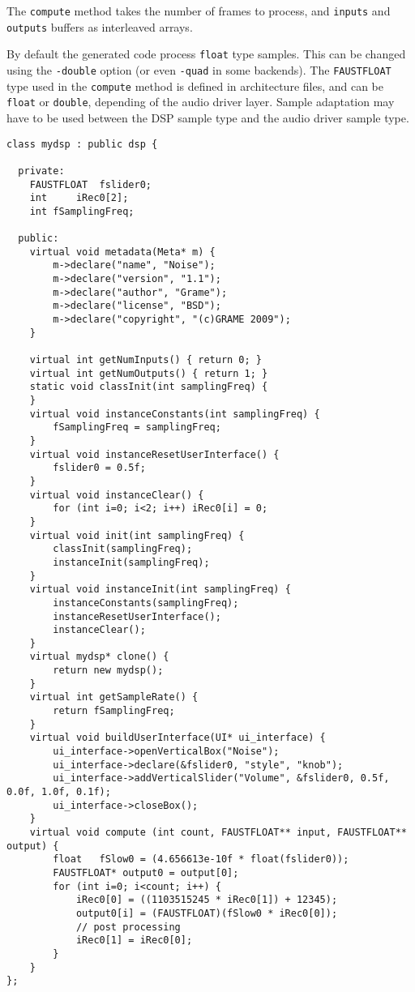 The \lstinline'compute' method takes the number of frames to process, and \lstinline'inputs' and \lstinline'outputs' buffers as interleaved arrays.

By default the generated code process \lstinline'float' type samples. This can be changed using the \lstinline'-double' option (or even \lstinline'-quad' in some backends). The \lstinline'FAUSTFLOAT' type used in the \lstinline'compute' method is defined in architecture files, and can be \lstinline'float' or \lstinline'double', depending of the audio driver layer. Sample adaptation may have to be used between the DSP sample type and the audio driver sample type.

\begin{lstlisting}[basicstyle=\ttfamily\footnotesize\color{yotxt}]
class mydsp : public dsp {

  private:
	FAUSTFLOAT 	fslider0;
	int 	iRec0[2];
	int fSamplingFreq;

  public:
	virtual void metadata(Meta* m) { 
		m->declare("name", "Noise");
		m->declare("version", "1.1");
		m->declare("author", "Grame");
		m->declare("license", "BSD");
		m->declare("copyright", "(c)GRAME 2009");
	}

	virtual int getNumInputs() { return 0; }
	virtual int getNumOutputs() { return 1; }
	static void classInit(int samplingFreq) {
	}
	virtual void instanceConstants(int samplingFreq) {
		fSamplingFreq = samplingFreq;
	}
	virtual void instanceResetUserInterface() {
		fslider0 = 0.5f;
	}
	virtual void instanceClear() {
		for (int i=0; i<2; i++) iRec0[i] = 0;
	}
	virtual void init(int samplingFreq) {
		classInit(samplingFreq);
		instanceInit(samplingFreq);
	}
	virtual void instanceInit(int samplingFreq) {
		instanceConstants(samplingFreq);
		instanceResetUserInterface();
		instanceClear();
	}
	virtual mydsp* clone() {
		return new mydsp();
	}
	virtual int getSampleRate() {
		return fSamplingFreq;
	}
	virtual void buildUserInterface(UI* ui_interface) {
		ui_interface->openVerticalBox("Noise");
		ui_interface->declare(&fslider0, "style", "knob");
		ui_interface->addVerticalSlider("Volume", &fslider0, 0.5f, 0.0f, 1.0f, 0.1f);
		ui_interface->closeBox();
	}
	virtual void compute (int count, FAUSTFLOAT** input, FAUSTFLOAT** output) {
		float 	fSlow0 = (4.656613e-10f * float(fslider0));
		FAUSTFLOAT* output0 = output[0];
		for (int i=0; i<count; i++) {
			iRec0[0] = ((1103515245 * iRec0[1]) + 12345);
			output0[i] = (FAUSTFLOAT)(fSlow0 * iRec0[0]);
			// post processing
			iRec0[1] = iRec0[0];
		}
	}
};
\end{lstlisting} 

